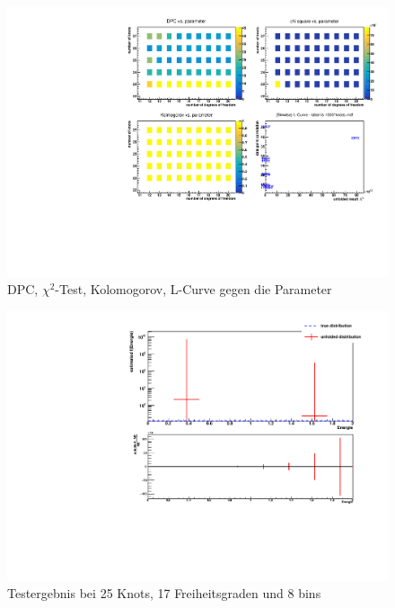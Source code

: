 \begin{figure}
  \centering
  \includegraphics[width=\linewidth]{Bilder/Overview.pdf}
  \caption{DPC, $\chi^2$-Test, Kolomogorov, L-Curve gegen die Parameter}
  \label{fig:Overview}
\end{figure}

\begin{figure}
  \centering
  \includegraphics[width=\linewidth]{Bilder/UnfoldB8K25F17.pdf}
  \caption{Testergebnis bei 25 Knots, 17 Freiheitsgraden und 8 bins}
  \label{fig:unfold}
\end{figure}
